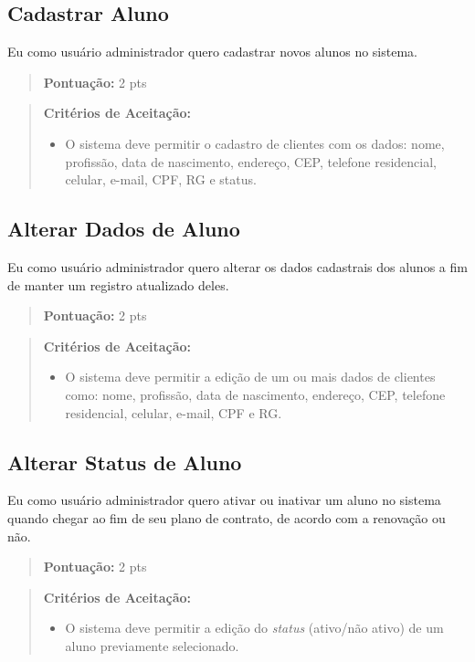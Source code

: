 \subsection[Cadastrar Aluno]{Cadastrar Aluno}
Eu como usuário administrador quero cadastrar novos alunos no sistema.
\begin{quote}
    \textbf{Pontuação:} 2 pts
\end{quote}
\begin{quote}
\textbf{Critérios de Aceitação:}
    \begin{itemize}
        \item O sistema deve permitir o cadastro de clientes com os dados: nome, profissão, data de nascimento, endereço, CEP, telefone residencial, celular, e-mail, CPF, RG e status.
    \end{itemize}
\end{quote}

\subsection[Alterar Dados de Aluno]{Alterar Dados de Aluno}
Eu como usuário administrador quero alterar os dados cadastrais dos alunos a fim
de manter um registro atualizado deles.
\begin{quote}
    \textbf{Pontuação:} 2 pts
\end{quote}
\begin{quote}
\textbf{Critérios de Aceitação:}
    \begin{itemize}
        \item O sistema deve permitir a edição de um ou mais dados de clientes como: nome,
        profissão, data de nascimento, endereço, CEP, telefone residencial, celular,
        e-mail, CPF e RG.
    \end{itemize}
\end{quote}

\subsection[Alterar Status de Aluno]{Alterar Status de Aluno}
Eu como usuário administrador quero ativar ou inativar um aluno no sistema
quando chegar ao fim de seu plano de contrato, de acordo com a renovação ou não.
\begin{quote}
    \textbf{Pontuação:} 2 pts
\end{quote}
\begin{quote}
\textbf{Critérios de Aceitação:}
    \begin{itemize}
        \item O sistema deve permitir a edição do \textsl{status} (ativo/não ativo) de um aluno
        previamente selecionado.
    \end{itemize}
\end{quote}

